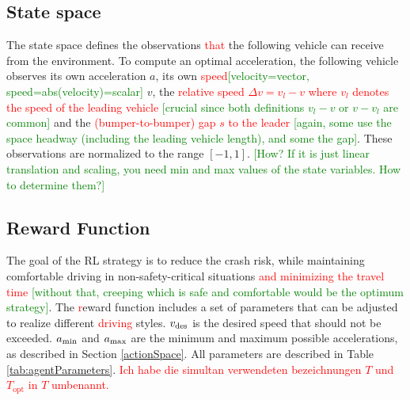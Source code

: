 \documentclass[review]{elsarticle}
\providecommand{\red}[1]{\textcolor{red}{#1}}
\providecommand{\green}[1]{\textcolor{green}{#1}}
\providecommand{\martin}[1]{\red{#1}} %
\providecommand{\martinc}[1]{\green{[#1]}} %
\providecommand{\sub}[1]{_{\mathrm{#1}}}  %
\providecommand{\3}{{\ss}}
\begin{document}
\subsection{State space}
The state space defines the observations \martin{that} the following
vehicle can receive from the environment. To compute an optimal
acceleration, the following vehicle observes its own acceleration $a$,
its own \martin{speed}\martinc{velocity=vector, speed=abs(velocity)=scalar}
$v$, the \martin{relative speed $\Delta v=v_l-v$ where $v_l$ denotes
  the speed of the leading vehicle} \martinc{crucial since both definitions
    $v_l-v$ or $v-v_l$ are common} and the \martin{(bumper-to-bumper)
  gap $s$ to the leader} \martinc{again, some use the space headway (including
    the leading vehicle length), and some the gap}. These
observations are normalized to the range $[-1,1]$. \martinc{How? If it
    is just linear translation and scaling, you need min and max
    values of the state variables. How to determine them?}


\subsection{Reward Function}
\label{rewardFunction}
The goal of the RL strategy is to reduce the crash risk, while
maintaining comfortable driving in non-safety-critical situations
\martin{and minimizing the travel time} \martinc{without that, creeping which
    is safe and comfortable would be the optimum strategy}. The
\martin{r}eward function includes a set of parameters that can be
adjusted to realize different \martin{driving} styles. $v_{\rm des}$
is the desired speed that should not be exceeded. $a_{\rm min}$ and
$a_{\rm max}$ are the minimum and maximum possible accelerations, as
described in Section \ref{actionSpace}. All parameters are described
in Table \ref{tab:agentParameters}.
\martin{Ich habe die simultan
  verwendeten bezeichnungen $T$ und $T\sub{opt}$ in $T$
  umbenannt.} 
\end{document}
